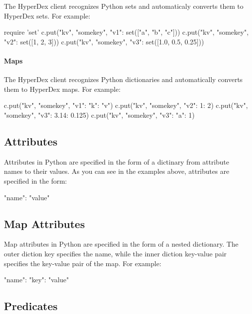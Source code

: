 The HyperDex client recognizes Python sets and automaticaly converts them to
HyperDex sets.  For example:

\begin{pythoncode}
require 'set'
c.put("kv", "somekey", {"v1": set(["a", "b", "c"])})
c.put("kv", "somekey", {"v2": set([1, 2, 3])})
c.put("kv", "somekey", {"v3": set([1.0, 0.5, 0.25])})
\end{pythoncode}

\paragraph{Maps}

The HyperDex client recognizes Python dictionaries and automatically converts them to
HyperDex maps.  For example:

\begin{pythoncode}
c.put("kv", "somekey", {"v1": {"k": "v"}})
c.put("kv", "somekey", {"v2": {1: 2}})
c.put("kv", "somekey", {"v3": {3.14: 0.125}})
c.put("kv", "somekey", {"v3": {"a": 1}})
\end{pythoncode}

\subsection{Attributes}
\label{sec:api:python-client:attributes}

Attributes in Python are specified in the form of a dictinary from attribute names to
their values.  As you can see in the examples above, attributes are specified in
the form:

\begin{pythoncode}
{"name": "value"}
\end{pythoncode}

\subsection{Map Attributes}
\label{sec:api:python-client:map-attributes}

Map attributes in Python are specified in the form of a nested dictionary.  The outer
diction key specifies the name, while the inner diction key-value pair specifies the
key-value pair of the map.  For example:

\begin{pythoncode}
{"name": {"key": "value"}}
\end{pythoncode}

\subsection{Predicates}
\label{sec:api:python-client:predicates}

